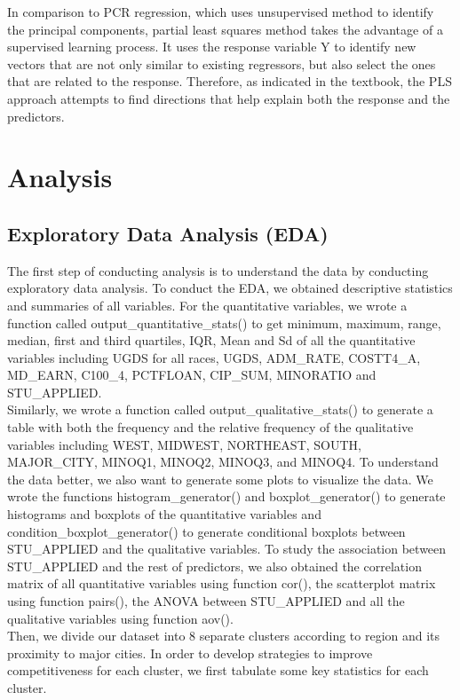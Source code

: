 \documentclass{article}
\begin{document}
In comparison to PCR regression, which uses unsupervised method to identify the principal components, partial least squares method takes the advantage of a supervised learning process. It uses the response variable Y to identify new vectors that are not only similar to existing regressors, but also select the ones that are related to the response. Therefore, as indicated in the textbook, the PLS approach attempts to find directions that help explain both the response and the predictors. 

\section{Analysis}

\subsection{Exploratory Data Analysis (EDA)}

The first step of conducting analysis is to understand the data by conducting exploratory data analysis. To conduct the EDA, we obtained descriptive statistics and summaries of all variables. For the quantitative variables, we wrote a function called output\_quantitative\_stats() to get minimum, maximum, range, median, first and third quartiles, IQR, Mean and Sd of all the quantitative variables including UGDS for all races, UGDS, ADM\_RATE, COSTT4\_A, MD\_EARN, C100\_4, PCTFLOAN, CIP\_SUM, MINORATIO and STU\_APPLIED.\\

Similarly, we wrote a function called output\_qualitative\_stats() to generate a table with both the frequency and the relative frequency of the qualitative variables including WEST,  MIDWEST, NORTHEAST, SOUTH, MAJOR\_CITY, MINOQ1, MINOQ2, MINOQ3, and MINOQ4. To understand the data better, we also want to generate some plots to visualize the data. We wrote the functions histogram\_generator() and boxplot\_generator() to generate histograms and boxplots of the quantitative variables and condition\_boxplot\_generator() to generate conditional boxplots between STU\_APPLIED and the qualitative variables. To study the association between STU\_APPLIED and the rest of predictors, we also obtained the correlation matrix of all quantitative variables using function cor(), the scatterplot matrix using function pairs(), the ANOVA between STU\_APPLIED and all the qualitative variables using function aov().\\

Then, we divide our dataset into 8 separate clusters according to region and its proximity to major cities. In order to develop strategies to improve competitiveness for each cluster, we first tabulate some key statistics for each cluster.\\
\end{document}
